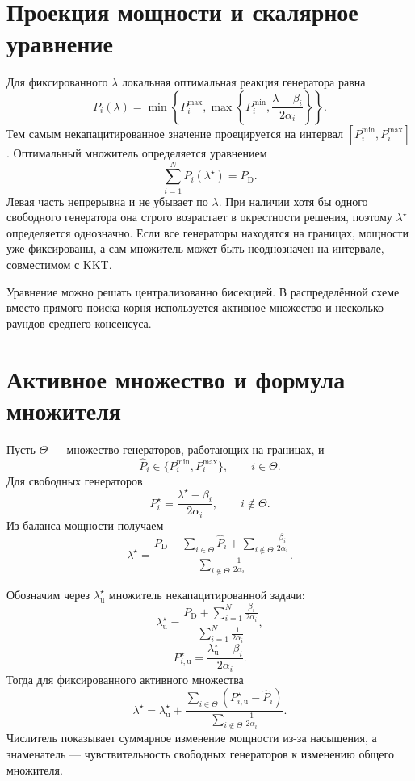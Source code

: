 \section{Проекция мощности и скалярное уравнение}

Для фиксированного \(\lambda\) локальная оптимальная реакция
генератора равна
\[
    P_i(\lambda)
    =
    \min\left\{
        P_i^{\max},
        \max\left\{
            P_i^{\min},
            \frac{\lambda-\beta_i}{2\alpha_i}
        \right\}
    \right\}.
\]
Тем самым некапацитированное значение проецируется на интервал
\([P_i^{\min},P_i^{\max}]\). Оптимальный множитель определяется
уравнением
\[
    \sum_{i=1}^{N}P_i(\lambda^\star)=P_{\mathrm D}.
\]
Левая часть непрерывна и не убывает по \(\lambda\). При наличии хотя
бы одного свободного генератора она строго возрастает в окрестности
решения, поэтому \(\lambda^\star\) определяется однозначно. Если все
генераторы находятся на границах, мощности уже фиксированы, а сам
множитель может быть неоднозначен на интервале, совместимом с KKT.

Уравнение можно решать централизованно бисекцией. В распределённой
схеме вместо прямого поиска корня используется активное множество и
несколько раундов среднего консенсуса.

\section{Активное множество и формула множителя}

Пусть \(\Theta\) --- множество генераторов, работающих на границах, и
\[
    \widehat P_i\in\{P_i^{\min},P_i^{\max}\},
    \qquad i\in\Theta.
\]
Для свободных генераторов
\[
    P_i^\star
    =
    \frac{\lambda^\star-\beta_i}{2\alpha_i},
    \qquad i\notin\Theta.
\]
Из баланса мощности получаем
\[
    \lambda^\star
    =
    \frac{
        P_{\mathrm D}
        -\displaystyle\sum_{i\in\Theta}\widehat P_i
        +\displaystyle\sum_{i\notin\Theta}
        \frac{\beta_i}{2\alpha_i}
    }{
        \displaystyle\sum_{i\notin\Theta}
        \frac1{2\alpha_i}
    }.
\]

Обозначим через \(\lambda_{\mathrm u}^\star\) множитель
некапацитированной задачи:
\[
    \lambda_{\mathrm u}^\star
    =
    \frac{
        P_{\mathrm D}
        +\displaystyle\sum_{i=1}^{N}
        \frac{\beta_i}{2\alpha_i}
    }{
        \displaystyle\sum_{i=1}^{N}
        \frac1{2\alpha_i}
    },
\]
\[
    P_{i,\mathrm u}^\star
    =
    \frac{\lambda_{\mathrm u}^\star-\beta_i}{2\alpha_i}.
\]
Тогда для фиксированного активного множества
\[
    \lambda^\star
    =
    \lambda_{\mathrm u}^\star
    +
    \frac{
        \displaystyle\sum_{i\in\Theta}
        \left(P_{i,\mathrm u}^\star-\widehat P_i\right)
    }{
        \displaystyle\sum_{i\notin\Theta}
        \frac1{2\alpha_i}
    }.
\]
Числитель показывает суммарное изменение мощности из-за насыщения, а
знаменатель --- чувствительность свободных генераторов к изменению
общего множителя.


